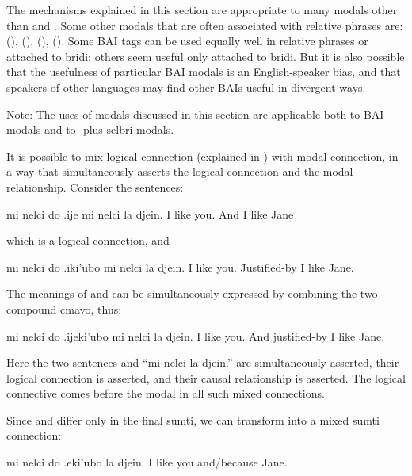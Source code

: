 The mechanisms explained in this section are appropriate to
    many modals other than  and . Some other
    modals that are often associated with relative phrases are:
     (),  (), 
    (),  (). Some BAI tags can be
    used equally well in relative phrases or attached to bridi;
    others seem useful only attached to bridi. But it is also
    possible that the usefulness of particular BAI modals is an
    English-speaker bias, and that speakers of other languages may
    find other BAIs useful in divergent ways. 

Note: The uses of modals discussed in this section are
    applicable both to BAI modals and to -plus-selbri
    modals.



It is possible to mix logical connection (explained in ) with modal connection, in a
    way that simultaneously asserts the logical connection and the
    modal relationship. Consider the sentences:
\begin{example}
mi nelci do .ije mi nelci la djein.\n
I like you.  And I like Jane
\end{example}

{\noindent}which is a logical connection, and
\begin{example}
mi nelci do .iki'ubo mi nelci la djein.\n
I like you.  Justified-by I like Jane.
\end{example}

The meanings of  and  can be simultaneously expressed
    by combining the two compound cmavo, thus:
\begin{example}
mi nelci do .ijeki'ubo mi nelci la djein.\n
I like you.  And justified-by I like Jane.
\end{example}

Here the two sentences  and ``mi nelci la
    djein.'' are simultaneously asserted, their logical connection
    is asserted, and their causal relationship is asserted. The
    logical connective  comes before the modal  in
    all such mixed connections. 

Since  and  differ only
    in the final sumti, we can transform  into a mixed sumti connection:
\begin{example}
mi nelci do .eki'ubo la djein.\n
I like you and/because Jane.
\end{example}

